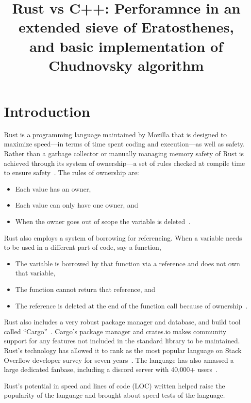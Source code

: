 \documentclass[10pt]{IEEEtran}
\begin{document}
\title{Rust vs C++: Perforamnce in an extended sieve of Eratosthenes, and basic implementation of Chudnovsky algorithm}
\author{
}
\date{}

\maketitle


\section{Introduction}
Rust is a programming language maintained by Mozilla that is designed to maximize speed---in terms of time spent coding and 
execution---as well as safety. Rather than a garbage collector or manually managing memory safety of Rust is achieved 
through its system of ownership---a set of rules checked at compile time to ensure safety~\cite{rust2023}. The rules of ownership are:
\begin{itemize}
    \item Each value has an owner,
    \item Each value can only have one owner, and
    \item When the owner goes out of scope the variable is deleted~\cite{rust2023}.
\end{itemize}
Rust also employs a system of borrowing for referencing. When a variable needs to be used in a different part of code, say a function, 
\begin{itemize}
    \item The variable is borrowed by that function via a reference and does not own that variable,
    \item The function cannot return that reference, and
    \item The reference is deleted at the end of the function call because of ownership~\cite{rust2023}.
\end{itemize}
Rust also includes a very robust package manager and database, and build tool called “Cargo”~\cite{cargobook}. 
Cargo's package manager and crates.io makes community support for any features not included in the standard library to be maintained.
Rust's technology has allowed it to rank as the most popular language on Stack Overflow developer survey for seven years~\cite{stackoverflow2022}. 
The language has also amassed a large dedicated fanbase, including a discord server with 40,000+ users~\cite{discord}.
\par
Rust's potential in speed and lines of code (LOC) written helped raise the popularity of the language and brought about speed tests of the language. 
\end{document}
